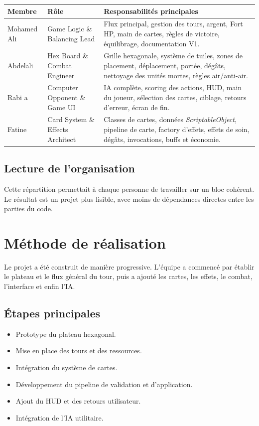 \documentclass[12pt,a4paper]{article}
\begin{document}
\begin{longtable}{p{} p{} p{}}
\toprule
\textbf{Membre} & \textbf{Rôle} & \textbf{Responsabilités principales} \\
\midrule
Mohamed Ali & Game Logic \& Balancing Lead & Flux principal, gestion des tours, argent, Fort HP, main de cartes, règles de victoire, équilibrage, documentation V1. \\
Abdelali & Hex Board \& Combat Engineer & Grille hexagonale, système de tuiles, zones de placement, déplacement, portée, dégâts, nettoyage des unités mortes, règles air/anti-air. \\
Rabi a & Computer Opponent \& Game UI & IA complète, scoring des actions, HUD, main du joueur, sélection des cartes, ciblage, retours d'erreur, écran de fin. \\
Fatine & Card System \& Effects Architect & Classes de cartes, données \textit{ScriptableObject}, pipeline de carte, factory d'effets, effets de soin, dégâts, invocations, buffs et économie. \\
\bottomrule
\end{longtable}

\subsection{Lecture de l'organisation}
Cette répartition permettait à chaque personne de travailler sur un bloc cohérent. Le résultat est un projet plus lisible, avec moins de dépendances directes entre les parties du code.

\section{Méthode de réalisation}
Le projet a été construit de manière progressive. L'équipe a commencé par établir le plateau et le flux général du tour, puis a ajouté les cartes, les effets, le combat, l'interface et enfin l'IA.

\subsection{Étapes principales}
\begin{itemize}[leftmargin=1.2cm]
    \item Prototype du plateau hexagonal.
    \item Mise en place des tours et des ressources.
    \item Intégration du système de cartes.
    \item Développement du pipeline de validation et d'application.
    \item Ajout du HUD et des retours utilisateur.
    \item Intégration de l'IA utilitaire.
\end{itemize}
\end{document}
